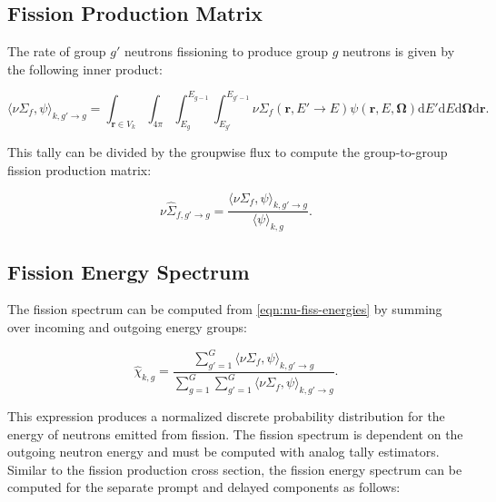 \subsection{Fission Production Matrix}
\label{subsubsec:tally-types-fiss-matrix}

The rate of group $g'$ neutrons fissioning to produce group $g$ neutrons is given by the following inner product:

\begin{equation}
\label{eqn:nu-fiss-energies}
\langle \nu\Sigma_{f}, \psi \rangle_{k,g'\rightarrow g} = \int_{\mathbf{r} \in V_{k}} \int_{4\pi} \int_{E_{g}}^{E_{g-1}} \int_{E_{g'}}^{E_{g'-1}} \nu\Sigma_{f}(\mathbf{r},E'\rightarrow E)\psi(\mathbf{r},E,\mathbf{\Omega}) \mathrm{d}E'\mathrm{d}E\mathrm{d}\mathbf{\Omega}\mathrm{d}\mathbf{r}.
\end{equation}

\noindent This tally can be divided by the groupwise flux to compute the group-to-group fission production matrix:

\begin{equation}
\label{eqn:fiss-prod-mat}
\nu\hat{\Sigma}_{f,g'\rightarrow g} = \frac{\langle \nu\Sigma_{f}, \psi \rangle_{k,g'\rightarrow g}}{\langle \psi \rangle_{k,g}}.
\end{equation}


\subsection{Fission Energy Spectrum}
\label{subsubsec:tally-types-chi}

The fission spectrum can be computed from \cref{eqn:nu-fiss-energies} by summing over incoming and outgoing energy groups:

\begin{equation}
\label{eqn:chi}
\hat{\chi}_{k,g} = \frac{\displaystyle\sum\limits_{g'=1}^{G} \langle \nu\Sigma_{f}, \psi \rangle_{k,g'\rightarrow g}}{\displaystyle\sum\limits_{g=1}^{G} \displaystyle\sum\limits_{g'=1}^{G} \langle \nu\Sigma_{f}, \psi \rangle_{k,g'\rightarrow g}}.
\end{equation}

\noindent This expression produces a normalized discrete probability distribution for the energy of neutrons emitted from fission. The fission spectrum is dependent on the outgoing neutron energy and must be computed with analog tally estimators. Similar to the fission production cross section, the fission energy spectrum can be computed for the separate prompt and delayed components as follows:

